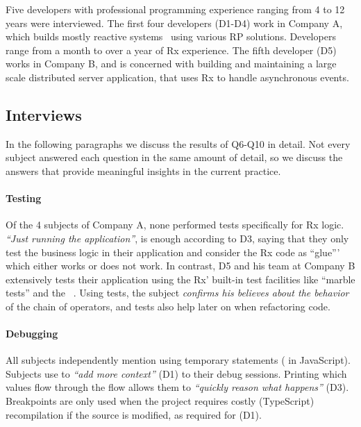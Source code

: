 Five developers with professional programming experience ranging from 4
to 12 years were interviewed.  The first four developers (D1-D4) work
in Company A, which builds mostly reactive systems~\cite{boner2014reactive}
using various RP solutions. Developers range from a month to over a
year of Rx experience.  The fifth developer (D5) works in Company B, and
is concerned with building and maintaining a large scale distributed
server application, that uses Rx to handle asynchronous events.

\subsection{Interviews} In the following paragraphs we discuss the
results of Q6-Q10 in detail.  Not every subject answered each question
in the same amount of detail, so we discuss the answers that provide
meaningful insights in the current practice.

\paragraph{Testing} Of the 4 subjects of Company A, none performed tests
specifically for Rx logic.  \emph{``Just running the application''}, is
enough according to D3, saying that they only test the business logic in
their application and consider the Rx code as ``glue''' which either
works or does not work.  In contrast, D5 and his team at Company B
extensively tests their application using the Rx' built-in test
facilities like ``marble tests'' and the ~\cite{reactivex}.
Using tests, the subject \emph{confirms his believes about the behavior}
of the chain of operators, and tests also help later on when refactoring
code.

\paragraph{Debugging} All subjects independently mention using temporary
\printfdebugging{} statements ( in JavaScript).
Subjects use \printfdebugging{} to \emph{``add more context''} (D1) to
their debug sessions.  Printing which values flow through the flow
allows them to \emph{``quickly reason what happens''} (D3).  Breakpoints
are only used when the project requires costly (TypeScript) recompilation 
if the source is modified, as required for \printfdebugging{} (D1).

